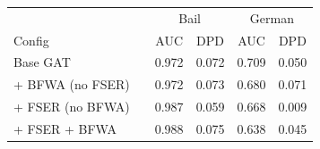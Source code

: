 \begin{tabular}{llcccc}
\toprule
 & & \multicolumn{2}{c}{Bail} & \multicolumn{2}{c}{German} \\
Config & & AUC & DPD & AUC & DPD \\
\midrule
Base GAT & & 0.972 & 0.072 & 0.709 & 0.050 \\
+ BFWA (no FSER) & & 0.972 & 0.073 & 0.680 & 0.071 \\
+ FSER (no BFWA) & & 0.987 & 0.059 & 0.668 & 0.009 \\
+ FSER + BFWA & & 0.988 & 0.075 & 0.638 & 0.045 \\
\bottomrule
\end{tabular}